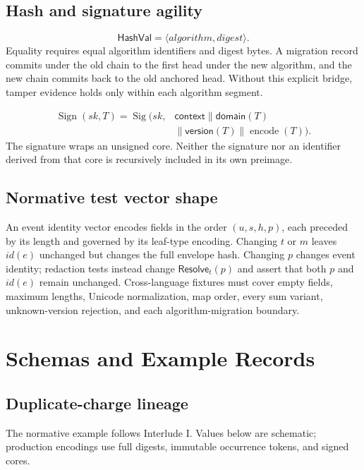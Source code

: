 \documentclass[11pt,openany]{book}
\begin{document}
\section{Hash and signature agility}
\[
 \mathsf{HashVal}=\langle algorithm,digest\rangle .
\]
Equality requires equal algorithm identifiers and digest bytes. A migration
record commits under the old chain to the first head under the new algorithm,
and the new chain commits back to the old anchored head. Without this explicit
bridge, tamper evidence holds only within each algorithm segment.

\[
 \begin{aligned}
 \operatorname{Sign}(sk,T)=\operatorname{Sig}\bigl(sk,{}&
 \mathsf{context}\parallel\mathsf{domain}(T)\\
 &\parallel\mathsf{version}(T)\parallel\operatorname{encode}(T)\bigr).
 \end{aligned}
\]
The signature wraps an unsigned core. Neither the signature nor an identifier
derived from that core is recursively included in its own preimage.

\section{Normative test vector shape}
An event identity vector encodes fields in the order \((u,s,h,p)\), each
preceded by its length and governed by its leaf-type encoding. Changing
\(t\) or \(m\) leaves \(id(e)\) unchanged but changes the full envelope hash.
Changing \(p\) changes event identity; redaction tests instead change
\(\mathsf{Resolve}_t(p)\) and assert that both \(p\) and \(id(e)\) remain
unchanged. Cross-language fixtures must cover empty fields, maximum lengths,
Unicode normalization, map order, every sum variant, unknown-version rejection,
and each algorithm-migration boundary.

\chapter{Schemas and Example Records}
\section{Duplicate-charge lineage}
The normative example follows Interlude I. Values below are schematic;
production encodings use full digests, immutable occurrence tokens, and signed
cores.
\end{document}
